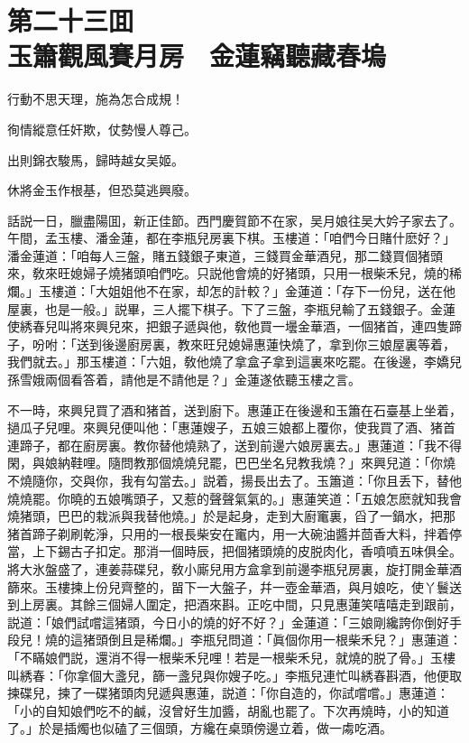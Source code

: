
\chapter*{第二十三囬　\\玉簫觀風賽月房　金蓮竊聽藏春塢}
\thispagestyle{empty}

\begin{myquote}
行動不思天理，施為怎合成規！

徇情縱意任奸欺，仗勢慢人尊己。

出則錦衣駿馬，歸時越女吴姬。

休將金玉作根基，但恐莫逃興廢。
\end{myquote}

話説一日，臘盡陽囬，新正佳節。西門慶賀節不在家，吴月娘往吴大妗子家去了。午間，孟玉樓、潘金蓮，都在李瓶兒房裏下棋。玉樓道：「咱們今日賭什麽好？」潘金蓮道：「咱每人三盤，賭五錢銀子東道，三錢買金華酒兒，那二錢買個猪頭來，敎來旺媳婦子燒猪頭咱們吃。只説他會燒的好猪頭，只用一根柴禾兒，燒的稀爛。」玉樓道：「大姐姐他不在家，却怎的計較？」金蓮道：「存下一份兒，送在他屋裏，也是一般。」説畢，三人擺下棋子。下了三盤，李瓶兒輸了五錢銀子。金蓮使綉春兒叫將來興兒來，把銀子遞與他，敎他買一壜金華酒，一個猪首，連四隻蹄子，吩咐：「送到後邊廚房裏，教來旺兒媳婦惠蓮快燒了，拿到你三娘屋裏等着，我們就去。」那玉樓道：「六姐，敎他燒了拿盒子拿到這裏來吃罷。在後邊，李嬌兒孫雪娥兩個看答着，請他是不請他是？」金蓮遂依聽玉樓之言。

不一時，來興兒買了酒和猪首，送到廚下。惠蓮正在後邊和玉簫在石臺基上坐着，撾瓜子兒哩。來興兒便叫他：「惠蓮嫂子，五娘三娘都上覆你，使我買了酒、猪首連蹄子，都在廚房裏。教你替他燒熟了，送到前邊六娘房裏去。」惠蓮道：「我不得閑，與娘納鞋哩。隨問教那個燒燒兒罷，巴巴坐名兒教我燒？」來興兒道：「你燒不燒隨你，交與你，我有勾當去。」説着，揚長出去了。玉簫道：「你且丢下，替他燒燒罷。你曉的五娘嘴頭子，又惹的聲聲氣氣的。」惠蓮笑道：「五娘怎麽就知我會燒猪頭，巴巴的栽派與我替他燒。」於是起身，走到大廚竃裏，舀了一鍋水，把那猪首蹄子剃刷乾淨，只用的一根長柴安在竃内，用一大碗油醬并茴香大料，拌着停當，上下錫古子扣定。那消一個時辰，把個猪頭燒的皮脱肉化，香噴噴五味俱全。將大氷盤盛了，連姜蒜碟兒，敎小廝兒用方盒拿到前邊李瓶兒房裏，旋打開金華酒篩來。玉樓揀上份兒齊整的，㽞下一大盤子，幷一壺金華酒，與月娘吃，使丫鬟送到上房裏。其餘三個婦人圍定，把酒來斟。正吃中間，只見惠蓮笑嘻嘻走到跟前，説道：「娘們試嚐這猪頭，今日小的燒的好不好？」金蓮道：「三娘剛纔誇你倒好手段兒！燒的這猪頭倒且是稀爛。」李瓶兒問道：「眞個你用一根柴禾兒？」惠蓮道：「不瞞娘們説，還消不得一根柴禾兒哩！若是一根柴禾兒，就燒的脱了骨。」玉樓叫綉春：「你拿個大盞兒，篩一盞兒與你嫂子吃。」李瓶兒連忙叫綉春斟酒，他便取揀碟兒，揀了一碟猪頭肉兒遞與惠蓮，説道：「你自造的，你試嚐嚐。」惠蓮道：「小的自知娘們吃不的鹹，沒曾好生加醬，胡亂也罷了。下次再燒時，小的知道了。」於是插燭也似磕了三個頭，方纔在桌頭傍邊立着，做一䖏吃酒。

